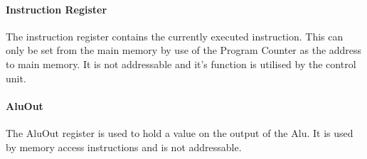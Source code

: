\paragraph{Instruction Register} 
The instruction register contains the currently executed instruction. 
This can only be set from the main memory by use of the Program Counter as the address to main memory.
It is not addressable and it's function is utilised by the control unit.

\paragraph{AluOut} 
The AluOut register is used to hold a value on the output of the Alu. 
It is used by memory access instructions and is not addressable. 
